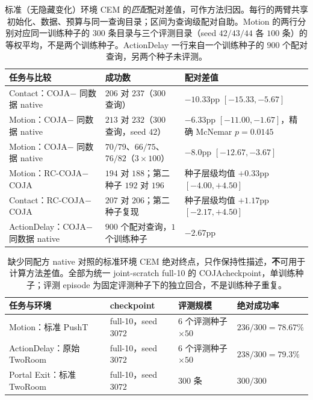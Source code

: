 \documentclass[UTF8,zihao=-4,fontset=fandol]{ctexart}
\newcommand{\method}{\textsc{COJA}}
\newcommand{\rcmethod}{\textsc{RC-COJA}}
\begin{document}
\begin{table}[t]
\centering
\small
\caption{标准（无隐藏变化）环境 CEM 的\emph{匹配}配对差值，可作方法归因。每行的两臂共享初始化、数据、预算与同一查询目录；区间为查询级配对自助。Motion 的两行分别对应同一训练种子的 $300$ 条目录与三个评测目录（seed $42/43/44$ 各 $100$ 条）的等权平均，不是两个训练种子。ActionDelay 一行来自一个训练种子的 $900$ 个配对查询，另两个种子未评测。}
\label{tab:retention-matched}
\begin{tabularx}{\textwidth}{@{}p{3.0cm}p{4.6cm}Y@{}}
\toprule
任务与比较 & 成功数 & 配对差值 \\
\midrule
Contact：\method $-$ 同数据 native & $206$ 对 $237$（$300$ 查询） & $-10.33$pp $[-15.33,-5.67]$ \\
Motion：\method $-$ 同数据 native & $213$ 对 $232$（$300$ 查询，seed $42$） & $-6.33$pp $[-11.00,-1.67]$，精确 McNemar $p=0.0145$ \\
Motion：\method $-$ 同数据 native & $70/79$、$66/75$、$76/82$（$3\times100$） & $-8.0$pp $[-12.67,-3.67]$ \\
Motion：\rcmethod $-$ \method & $194$ 对 $188$；第二种子 $192$ 对 $196$ & 种子层级均值 $+0.33$pp $[-4.00,+4.50]$ \\
Contact：\rcmethod $-$ \method & $207$ 对 $206$；第二种子复现 & 种子层级均值 $+1.17$pp $[-2.17,+4.50]$ \\
ActionDelay：\method $-$ 同数据 native & $900$ 个配对查询，$1$ 个训练种子 & $-2.67$pp \\
\bottomrule
\end{tabularx}
\end{table}

\begin{table}[t]
\centering
\small
\caption{缺少同配方 native 对照的标准环境 CEM 绝对终点，只作保持性描述，\textbf{不}可用于计算方法差值。全部为统一 joint-scratch full-10 的 \method checkpoint，单训练种子；评测 episode 为固定评测种子下的独立回合，不是训练种子重复。}
\label{tab:retention-abs}
\begin{tabular}{@{}llll@{}}
\toprule
任务与环境 & checkpoint & 评测规模 & 绝对成功率 \\
\midrule
Motion：标准 PushT & full-10，seed $3072$ & $6$ 个评测种子 $\times50$ & $236/300=78.67\%$ \\
ActionDelay：原始 TwoRoom & full-10，seed $3072$ & $6$ 个评测种子 $\times50$ & $238/300=79.3\%$ \\
Portal Exit：标准 TwoRoom & full-10，seed $3072$ & $300$ 条 & $300/300$ \\
\bottomrule
\end{tabular}
\end{table}
\end{document}
